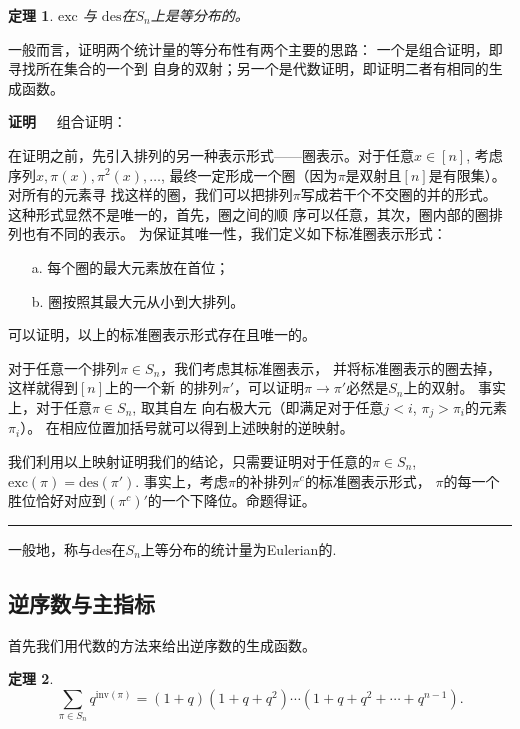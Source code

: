 \documentclass[a4paper,11pt,twoside]{book}
\newtheorem{thm}{定理}[section]
\def\qed{\nopagebreak\hfill{\rule{4pt}{7pt}}\medbreak}
\def\pf{{\bf 证明~~ }}
\def \des{\mathrm{des}}
\def \exc{\mathrm{exc}}
\def \inv{\mathrm{inv}}
\begin{document}
\begin{thm} \label{exc_des}
$\exc$ 与 $\des$在$S_n$上是等分布的。
\end{thm}

一般而言，证明两个统计量的等分布性有两个主要的思路：
一个是组合证明，即寻找所在集合的一个到
自身的双射；另一个是代数证明，即证明二者有相同的生成函数。

\pf 组合证明：

在证明之前，先引入排列的另一种表示形式——圈表示。对于任意$x\in
[n]$, 考虑 序列$x,\pi(x),\pi^2(x),\ldots$,
最终一定形成一个圈（因为$\pi$是双射且$[n]$是有限集）。对所有的元素寻
找这样的圈，我们可以把排列$\pi$写成若干个不交圈的并的形式。
这种形式显然不是唯一的，首先，圈之间的顺
序可以任意，其次，圈内部的圈排列也有不同的表示。
为保证其唯一性，我们定义如下标准圈表示形式：

\begin{itemize}
   \item [a.]每个圈的最大元素放在首位；
   \item [b.]圈按照其最大元从小到大排列。
\end{itemize}


可以证明，以上的标准圈表示形式存在且唯一的。

对于任意一个排列$\pi\in S_n$，我们考虑其标准圈表示，
并将标准圈表示的圈去掉，这样就得到$[n]$上的一个新
的排列$\pi'$，可以证明$\pi\rightarrow \pi'$必然是$S_n$上的双射。
事实上，对于任意$\pi\in S_n$, 取其自左
向右极大元（即满足对于任意$j<i$, $\pi_j>\pi_i$的元素$\pi_i$）。
在相应位置加括号就可以得到上述映射的逆映射。

我们利用以上映射证明我们的结论，只需要证明对于任意的$\pi\in S_n$,
$\exc(\pi)=\des(\pi')$.
事实上，考虑$\pi$的补排列$\pi^c$的标准圈表示形式，
$\pi$的每一个胜位恰好对应到$(\pi^c)'$的一个下降位。命题得证。\qed

一般地，称与$\des$在$S_n$上等分布的统计量为Eulerian的.


\subsection{逆序数与主指标}

首先我们用代数的方法来给出逆序数的生成函数。

\begin{thm}
\begin{equation}
\sum_{\pi\in
S_n}q^{\inv(\pi)}=(1+q)(1+q+q^2)\cdots(1+q+q^2+\cdots+q^{n-1}).
\end{equation}
\end{thm}
\end{document}
